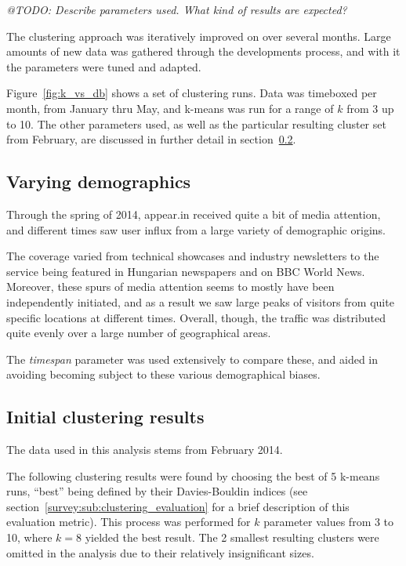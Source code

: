\emph{@TODO: Describe parameters used. What kind of results are expected?}

The clustering approach was iteratively improved on over several months. Large amounts of new data was gathered through the developments process, and with it the parameters were tuned and adapted.

Figure~\ref{fig:k_vs_db} shows a set of clustering runs. Data was timeboxed per month, from January thru May, and k-means was run for a range of $k$ from 3 up to 10. The other parameters used, as well as the particular resulting cluster set from February, are discussed in further detail in section~\ref{eval:sec:clustering_results}.

\subsection{Varying demographics}
\label{eval:sub:varying_demographics}

Through the spring of 2014, appear.in received quite a bit of media attention, and different times saw user influx from a large variety of demographic origins.

The coverage varied from technical showcases and industry newsletters to the service being featured in Hungarian newspapers and on BBC World News. Moreover, these spurs of media attention seems to mostly have been independently initiated, and as a result we saw large peaks of visitors from quite specific locations at different times. Overall, though, the traffic was distributed quite evenly over a large number of geographical areas.

The \emph{timespan} parameter was used extensively to compare these, and aided in avoiding becoming subject to these various demographical biases.

\subsection{Initial clustering results}
\label{eval:sec:clustering_results}

The data used in this analysis stems from February 2014.

The following clustering results were found by choosing the best of 5 k-means runs, ``best'' being defined by their Davies-Bouldin indices (see section~\ref{survey:sub:clustering_evaluation} for a brief description of this evaluation metric). This process was performed for $k$ parameter values from 3 to 10, where $k = 8$ yielded the best result. The 2 smallest resulting clusters were omitted in the analysis due to their relatively insignificant sizes.

